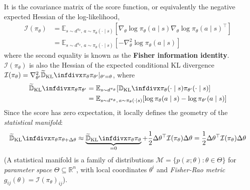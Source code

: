 \documentclass[11pt, letterpaper]{article}
\begin{document}
\begin{concept}
    It is the covariance matrix of the score function, or equivalently the negative expected Hessian of the log-likelihood, 
    \begin{align*}
        \mathcal{I}(\pi_\theta) 
        &= \mathbb{E}_{s \sim d^{\pi_\theta},\, a \sim \pi_\theta(\cdot \mid s)} \left[\nabla_\theta \log \pi_\theta(a \mid s) \nabla_\theta \log \pi_\theta(a \mid s)^\top \right] \\
        &= \mathbb{E}_{s \sim d^{\pi_\theta},\, a \sim \pi_\theta(\cdot \mid s)} \left[-\nabla_\theta^2 \log \pi_\theta(a \mid s)\right]
    \end{align*}
    where the second equality is known as the \textbf{Fisher information identity}. \(\mathcal{I}(\pi_\theta)\) is also the Hessian of the expected conditional KL divergence \(\mathcal{I}(\pi_\theta) = \nabla_{\theta'}^2 \TKL{\pi_\theta}{\pi_{\theta'}} \rvert_{\theta' = \theta}\), where
    \begin{align*}
        \TKL{\pi_\theta}{\pi_{\theta'}} 
        &= \mathbb{E}_{s \sim d^{\pi_\theta}}[\KL{\pi_\theta(\cdot \mid s)}{\pi_{\theta'}(\cdot \mid s)} ] \\
        &= \mathbb{E}_{s \sim d^{\pi_\theta},\, a \sim \pi_\theta(\cdot \mid s)} [\log \pi_\theta(a \mid s) - \log \pi_{\theta'}(a \mid s)]
    \end{align*}
    Since the score has zero expectation, it locally defines the geometry of the \textit{statistical manifold}: 
    \[
        \TKL{\pi_\theta}{\pi_{\theta + \Delta\theta}} 
        \approx \underbrace{\TKL{\pi_\theta}{\pi_{\theta}}}_{=0} + \frac{1}{2}\Delta\theta^\top \mathcal{I}(\pi_\theta) \Delta\theta
        = \frac{1}{2}\Delta\theta^\top \mathcal{I}(\pi_\theta) \Delta\theta
    \]
    (A statistical manifold is a family of distributions \(\mathcal{M} = \{p(x; \theta) : \theta \in \Theta \}\) for \textit{parameter space} \(\Theta \subseteq \mathbb{R}^n\), with local coordinates \(\theta^i\) and \textit{Fisher-Rao metric} \(g_{ij}(\theta) = \mathcal{I}(\pi_\theta)_{ij}\)). 
\end{concept}
\end{document}
